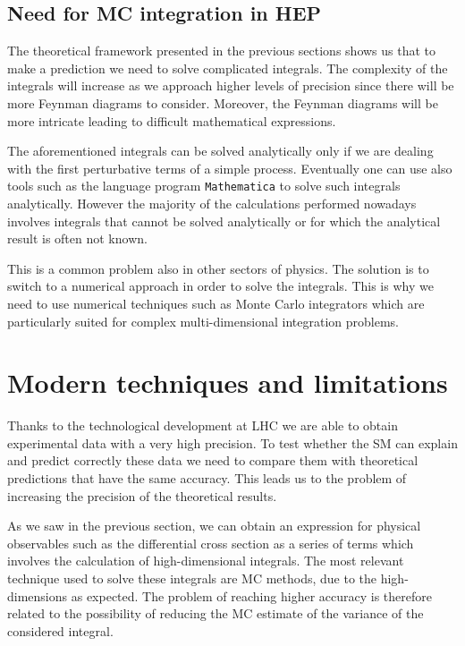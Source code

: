 \documentclass[../main/main.tex]{subfiles}
\begin{document}
\subsection{Need for MC integration in HEP}
The theoretical framework presented in the previous sections shows us that to make a prediction we need to solve complicated integrals. 
The complexity of the integrals will increase as we approach higher levels of precision since there will be more Feynman diagrams to consider. Moreover, the Feynman diagrams will be more intricate leading to difficult mathematical expressions.

The aforementioned integrals can be solved analytically only if we are dealing with the first perturbative terms of a simple process. Eventually one can use also tools such as the language program \texttt{Mathematica} \cite{Mathematica} to solve such integrals analytically. However the majority of the calculations performed nowadays involves integrals that cannot be solved analytically or for which the analytical result is often not known.

This is a common problem also in other sectors of physics. The solution is to switch to a numerical approach in order to solve the integrals. This is why we need to use numerical techniques such as Monte Carlo integrators which are particularly suited for complex multi-dimensional integration problems.  



\section{Modern techniques and limitations}

Thanks to the technological development at LHC we are able to obtain experimental data with a very high precision. To test whether 
the SM can explain and predict correctly these data we need to compare them with  theoretical predictions that have the same accuracy.
This leads us to the problem of increasing the precision of the theoretical results. 

As we saw in the previous section, we can obtain an expression for physical observables such as the differential cross section as a series of terms which involves the calculation of high-dimensional integrals. The most relevant technique used to solve these integrals are MC methods, due to the high-dimensions as expected. The problem of reaching higher accuracy is therefore related 
to the possibility of reducing the MC estimate of the variance of the considered integral.
\end{document}
